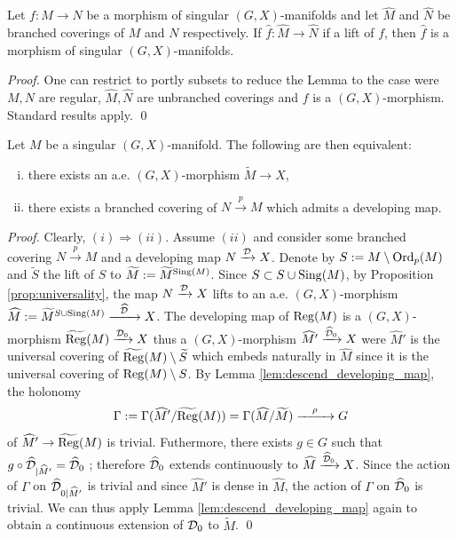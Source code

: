 \begin{lem}
 Let $f:M\rightarrow N$ be a morphism of singular $(G,X)$-manifolds and let $\hat M$ and $\hat N$ be branched coverings of $M$ and $N$ respectively. 
If $\hat f:\hat M \rightarrow \hat N$ if a lift of $f$, then $\hat f$ is a morphism of singular $(G,X)$-manifolds.
\end{lem}
\begin{proof}
One can restrict to portly subsets to reduce the Lemma to the case were $M,N$ are regular, $\hat M,\hat N$ are unbranched coverings and $f$ is a $(G,X)$-morphism. Standard results apply. 
\qed\end{proof}

\begin{prop} \label{prop:branched_devmap}Let $M$ be a singular $(G,X)$-manifold. The following are then equivalent:
\begin{enumerate}[(i)]
 \item there exists an a.e. $(G,X)$-morphism $\widetilde M\rightarrow X$,
 \item there exists a branched covering of $N\xrightarrow{p} M$ which admits a developing map.
\end{enumerate} 
\end{prop}
\begin{proof}
 Clearly, $(i)\Rightarrow (ii)$.  Assume $(ii)$ and consider some branched covering $N\xrightarrow{p}M$  and a developing map $N\xrightarrow{\mathcal{D}} X$. Denote by $S:=M\setminus \mathrm{Ord}_p(M)$ and $\widetilde S$  the lift of $S$ to $\widetilde M:=\widetilde M^{\mathrm{Sing}(M)}$.   
 Since  $S\subset S\cup \mathrm{Sing}(M)$, by Proposition \ref{prop:universality}, the  map $N \xrightarrow{\mathcal{D}} X$ lifts to an a.e. $(G,X)$-morphism $\widehat M := \widetilde M^{S\cup \mathrm{Sing}(M)}\xrightarrow{~~\widehat {\mathcal{D}}~~} X$. 
 The developing map of $\mathrm{Reg}(M)$ is a $(G,X)$-morphism $\widetilde{\mathrm{Reg}}(M)\xrightarrow{\mathcal{D}_0} X $ thus a $(G,X)$-morphism $ \widehat M' \xrightarrow{\widehat {\mathcal{D}}_0} X$ were $\widehat M'$ is the universal covering of $\widetilde{\mathrm{Reg}}(M)\setminus \widetilde S$ which embeds naturally in $\widehat M$ since it is the universal covering of $\mathrm{Reg}(M)\setminus S$. By Lemma \ref{lem:descend_developing_map}, the holonomy 
 $$\Gamma:=\Gamma(\widehat M'/\widetilde{\mathrm{Reg}}(M)) = \Gamma(\widehat M/\widetilde M) \xrightarrow{~~~\rho~~~} G$$ of $ \widehat M' \rightarrow \widetilde{\mathrm{Reg}}(M)$ is trivial. 
 Futhermore, there exists $g\in G$ such that $g\circ\widehat {\mathcal{D}}_{|\widehat M'} = \widehat {\mathcal{D}}_0$ ; therefore $\widehat {\mathcal{D}}_0$ extends continuously to $\widehat M \xrightarrow{\widehat {\mathcal{D}}_0} X$.  Since the action of $\Gamma$ on $\widehat{\mathcal{D}}_{0|\widehat M'}$ is trivial  and  since $\widehat M'$ is dense in $\widehat M$, the action of $\Gamma$ on $\widehat {\mathcal{D}}_0$ is trivial. We can thus apply Lemma \ref{lem:descend_developing_map} again to obtain a continuous extension of $\mathcal{D}_0$ to $\widetilde M$.
\qed\end{proof}



